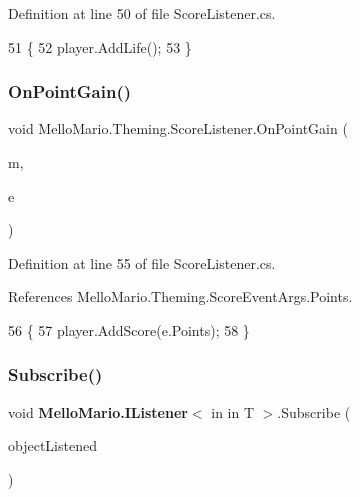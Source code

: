 Definition at line 50 of file Score\+Listener.\+cs.


\begin{DoxyCode}
51         \{
52             player.AddLife();
53         \}
\end{DoxyCode}
\mbox{\label{classMelloMario_1_1Theming_1_1ScoreListener_a92b50462c9008e02566a265b569be300}} 
\subsubsection{On\+Point\+Gain()}
{\footnotesize\ttfamily void Mello\+Mario.\+Theming.\+Score\+Listener.\+On\+Point\+Gain (\begin{DoxyParamCaption}\item[{\textbf{ Base\+Collidable\+Object}}]{m,  }\item[{\textbf{ Score\+Event\+Args}}]{e }\end{DoxyParamCaption})\hspace{0.3cm}{\ttfamily [private]}}



Definition at line 55 of file Score\+Listener.\+cs.



References Mello\+Mario.\+Theming.\+Score\+Event\+Args.\+Points.


\begin{DoxyCode}
56         \{
57             player.AddScore(e.Points);
58         \}
\end{DoxyCode}
\mbox{\label{interfaceMelloMario_1_1IListener_a7cc6b69de82ebae5ec8a4d6b4008a2bc}} 
\subsubsection{Subscribe()\hspace{0.1cm}{\footnotesize\ttfamily [1/2]}}
{\footnotesize\ttfamily void \textbf{ Mello\+Mario.\+I\+Listener}$<$ in in T $>$.Subscribe (\begin{DoxyParamCaption}\item[{T}]{object\+Listened }\end{DoxyParamCaption})\hspace{0.3cm}{\ttfamily [inherited]}}


